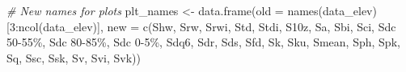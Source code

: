 \documentclass[
]{article}
\newenvironment{Shaded}{\begin{snugshade}}{\end{snugshade}}
\newcommand{\AttributeTok}[1]{\textcolor[rgb]{0.77,0.63,0.00}{#1}}
\newcommand{\CommentTok}[1]{\textcolor[rgb]{0.56,0.35,0.01}{\textit{#1}}}
\newcommand{\DecValTok}[1]{\textcolor[rgb]{0.00,0.00,0.81}{#1}}
\newcommand{\FunctionTok}[1]{\textcolor[rgb]{0.00,0.00,0.00}{#1}}
\newcommand{\NormalTok}[1]{#1}
\newcommand{\OtherTok}[1]{\textcolor[rgb]{0.56,0.35,0.01}{#1}}
\newcommand{\SpecialCharTok}[1]{\textcolor[rgb]{0.00,0.00,0.00}{#1}}
\newcommand{\StringTok}[1]{\textcolor[rgb]{0.31,0.60,0.02}{#1}}
\begin{document}
\begin{Shaded}
\begin{Highlighting}[]
\CommentTok{\# New names for plots}
\NormalTok{plt\_names }\OtherTok{\textless{}{-}} \FunctionTok{data.frame}\NormalTok{(}\AttributeTok{old =} \FunctionTok{names}\NormalTok{(data\_elev)[}\DecValTok{3}\SpecialCharTok{:}\FunctionTok{ncol}\NormalTok{(data\_elev)],}
                        \AttributeTok{new =} \FunctionTok{c}\NormalTok{(}\StringTok{\textquotesingle{}Shw\textquotesingle{}}\NormalTok{, }\StringTok{\textquotesingle{}Srw\textquotesingle{}}\NormalTok{, }\StringTok{\textquotesingle{}Srwi\textquotesingle{}}\NormalTok{, }\StringTok{\textquotesingle{}Std\textquotesingle{}}\NormalTok{, }\StringTok{\textquotesingle{}Stdi\textquotesingle{}}\NormalTok{, }\StringTok{\textquotesingle{}S10z\textquotesingle{}}\NormalTok{,}
                                \StringTok{\textquotesingle{}Sa\textquotesingle{}}\NormalTok{, }\StringTok{\textquotesingle{}Sbi\textquotesingle{}}\NormalTok{, }\StringTok{\textquotesingle{}Sci\textquotesingle{}}\NormalTok{, }\StringTok{\textquotesingle{}Sdc 50{-}55\%\textquotesingle{}}\NormalTok{, }\StringTok{\textquotesingle{}Sdc 80{-}85\%\textquotesingle{}}\NormalTok{,}
                                \StringTok{\textquotesingle{}Sdc 0{-}5\%\textquotesingle{}}\NormalTok{, }\StringTok{\textquotesingle{}Sdq6\textquotesingle{}}\NormalTok{, }\StringTok{\textquotesingle{}Sdr\textquotesingle{}}\NormalTok{, }\StringTok{\textquotesingle{}Sds\textquotesingle{}}\NormalTok{, }\StringTok{\textquotesingle{}Sfd\textquotesingle{}}\NormalTok{, }\StringTok{\textquotesingle{}Sk\textquotesingle{}}\NormalTok{,}
                                \StringTok{\textquotesingle{}Sku\textquotesingle{}}\NormalTok{, }\StringTok{\textquotesingle{}Smean\textquotesingle{}}\NormalTok{, }\StringTok{\textquotesingle{}Sph\textquotesingle{}}\NormalTok{, }\StringTok{\textquotesingle{}Spk\textquotesingle{}}\NormalTok{, }\StringTok{\textquotesingle{}Sq\textquotesingle{}}\NormalTok{, }\StringTok{\textquotesingle{}Ssc\textquotesingle{}}\NormalTok{,}
                                \StringTok{\textquotesingle{}Ssk\textquotesingle{}}\NormalTok{, }\StringTok{\textquotesingle{}Sv\textquotesingle{}}\NormalTok{, }\StringTok{\textquotesingle{}Svi\textquotesingle{}}\NormalTok{, }\StringTok{\textquotesingle{}Svk\textquotesingle{}}\NormalTok{))}


\end{Highlighting}
\end{Shaded}
\end{document}
